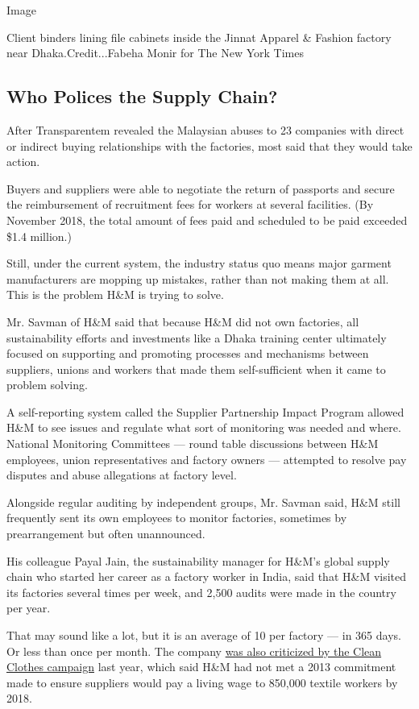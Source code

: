 Image

Client binders lining file cabinets inside the Jinnat Apparel \& Fashion
factory near Dhaka.Credit...Fabeha Monir for The New York Times

\hypertarget{who-polices-the-supply-chain}{%
\subsection{Who Polices the Supply
Chain?}\label{who-polices-the-supply-chain}}

After Transparentem revealed the Malaysian abuses to 23 companies with
direct or indirect buying relationships with the factories, most said
that they would take action.

Buyers and suppliers were able to negotiate the return of passports and
secure the reimbursement of recruitment fees for workers at several
facilities. (By November 2018, the total amount of fees paid and
scheduled to be paid exceeded \$1.4 million.)

Still, under the current system, the industry status quo means major
garment manufacturers are mopping up mistakes, rather than not making
them at all. This is the problem H\&M is trying to solve.

Mr. Savman of H\&M said that because H\&M did not own factories, all
sustainability efforts and investments like a Dhaka training center
ultimately focused on supporting and promoting processes and mechanisms
between suppliers, unions and workers that made them self-sufficient
when it came to problem solving.

A self-reporting system called the Supplier Partnership Impact Program
allowed H\&M to see issues and regulate what sort of monitoring was
needed and where. National Monitoring Committees --- round table
discussions between H\&M employees, union representatives and factory
owners --- attempted to resolve pay disputes and abuse allegations at
factory level.

Alongside regular auditing by independent groups, Mr. Savman said, H\&M
still frequently sent its own employees to monitor factories, sometimes
by prearrangement but often unannounced.

His colleague Payal Jain, the sustainability manager for H\&M's global
supply chain who started her career as a factory worker in India, said
that H\&M visited its factories several times per week, and 2,500 audits
were made in the country per year.

That may sound like a lot, but it is an average of 10 per factory --- in
365 days. Or less than once per month. The company
\href{https://www.reuters.com/article/us-workers-garment-abuse/hm-accused-of-failing-to-ensure-fair-wages-for-global-factory-workers-idUSKCN1M41GR}{was
also criticized by the Clean Clothes campaign} last year, which said
H\&M had not met a 2013 commitment made to ensure suppliers would pay a
living wage to 850,000 textile workers by 2018.

